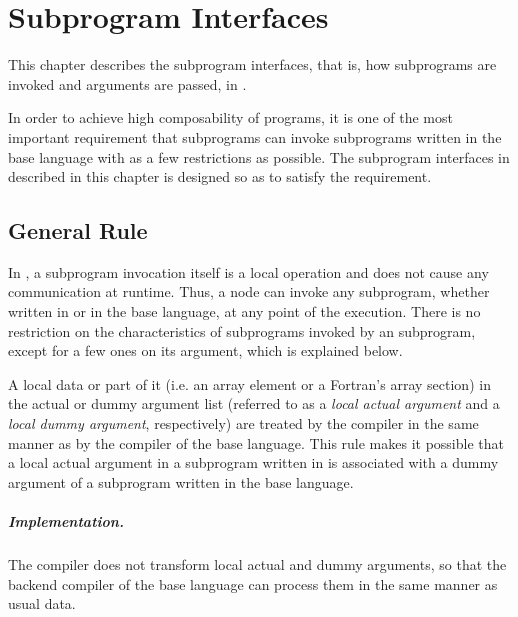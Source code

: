 \chapter{Subprogram Interfaces}

This chapter describes the subprogram interfaces, that is, how
subprograms are invoked and arguments are passed, in {\XMP}.

In order to achieve high composability of {\XMP} programs, it is one of
the most important requirement that {\XMP} subprograms can invoke
subprograms written in the base language with as a few restrictions as
possible. The subprogram interfaces in {\XMP} described in this chapter
is designed so as to satisfy the requirement.


\section{General Rule}

In {\XMP}, a subprogram invocation itself is a local operation and does
not cause any communication at runtime. Thus, a node can invoke any
subprogram, whether written in {\XMP} or in the base language, at any
point of the execution.
%
There is no restriction on the characteristics of subprograms invoked by
an {\XMP} subprogram, except for a few ones on its argument, which is
explained below.

A local data or part of it (i.e. an array element or a Fortran's array
section) in the actual or dummy argument list (referred to as a {\it
local actual argument} and a {\it local dummy argument}, respectively)
are treated by the {\XMP} compiler in the same manner as by the compiler
of the base language.
%
This rule makes it possible that a local actual argument in a subprogram
written in {\XMP} is associated with a dummy argument of a subprogram
written in the base language.


\paragraph{Implementation.}

The {\XMP} compiler does not transform local actual and dummy arguments,
so that the backend compiler of the base language can process them in
the same manner as usual data.

